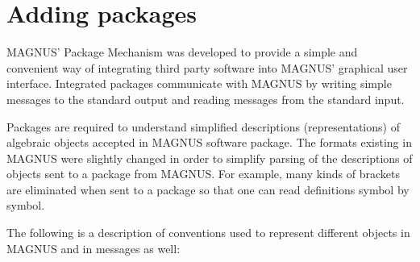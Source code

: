 \documentclass[12pt]{article}
\def\magnus{MAGNUS }
\def\nsmagnus{MAGNUS}
\begin{document}
\section{Adding packages}

\nsmagnus' Package Mechanism was developed to provide a simple and
convenient way of integrating third party software into \nsmagnus'
graphical user interface.
Integrated packages communicate with \magnus by writing simple
messages to  the standard output and reading messages from the
standard input.

Packages are required to  understand simplified
descriptions (representations) of algebraic  objects accepted in
\magnus software package. The formats existing in \magnus were
slightly changed in order to simplify parsing of the descriptions
of objects sent to a package from \nsmagnus.
For example, many kinds of brackets are eliminated when sent to a
package so that one can read definitions symbol by symbol.

The following is a description of conventions used to represent
different objects in \magnus and in messages as well:
\end{document}
